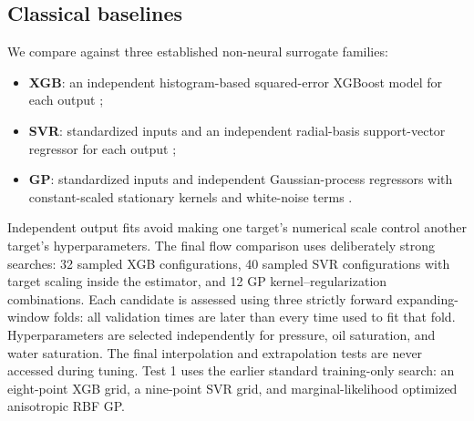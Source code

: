 \subsection{Classical baselines}

We compare against three established non-neural surrogate families:
\begin{itemize}[leftmargin=*]
    \item \textbf{XGB}: an independent histogram-based squared-error XGBoost model for each output \cite{chen2016xgboost};
    \item \textbf{SVR}: standardized inputs and an independent radial-basis support-vector regressor for each output \cite{drucker1997support};
    \item \textbf{GP}: standardized inputs and independent Gaussian-process regressors with constant-scaled stationary kernels and white-noise terms \cite{rasmussen2006gaussian}.
\end{itemize}
Independent output fits avoid making one target's numerical scale control another target's hyperparameters. The final flow comparison uses deliberately strong searches: 32 sampled XGB configurations, 40 sampled SVR configurations with target scaling inside the estimator, and 12 GP kernel--regularization combinations. Each candidate is assessed using three strictly forward expanding-window folds: all validation times are later than every time used to fit that fold. Hyperparameters are selected independently for pressure, oil saturation, and water saturation. The final interpolation and extrapolation tests are never accessed during tuning. Test 1 uses the earlier standard training-only search: an eight-point XGB grid, a nine-point SVR grid, and marginal-likelihood optimized anisotropic RBF GP.
